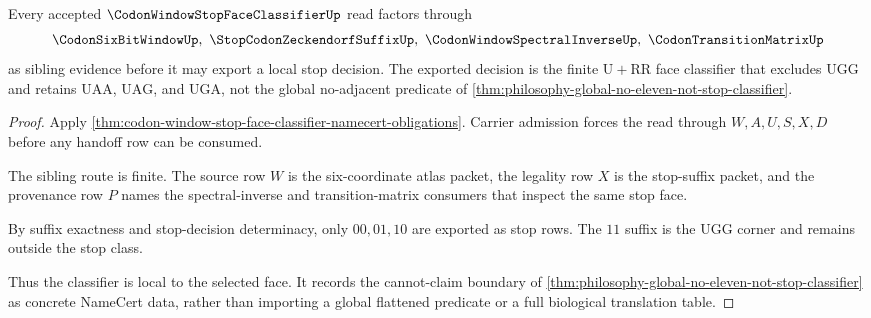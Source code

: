 \begin{theorem}
\label{thm:codon-window-stop-face-classifier-exclusion-route}
Every accepted $\CodonWindowStopFaceClassifierUp$ read factors through
$$
\CodonSixBitWindowUp,\ \StopCodonZeckendorfSuffixUp,\ \CodonWindowSpectralInverseUp,\ \CodonTransitionMatrixUp
$$
as sibling evidence before it may export a local stop decision. The exported decision is the finite $\mathrm{U}+\mathrm{RR}$ face classifier that excludes $\mathrm{UGG}$ and retains $\mathrm{UAA}$, $\mathrm{UAG}$, and $\mathrm{UGA}$, not the global no-adjacent predicate of \autoref{thm:philosophy-global-no-eleven-not-stop-classifier}.
\end{theorem}
\begin{proof}
Apply \autoref{thm:codon-window-stop-face-classifier-namecert-obligations}. Carrier admission forces the read through $W,A,U,S,X,D$ before any handoff row can be consumed.

The sibling route is finite. The source row $W$ is the six-coordinate atlas packet, the legality row $X$ is the stop-suffix packet, and the provenance row $P$ names the spectral-inverse and transition-matrix consumers that inspect the same stop face.

By suffix exactness and stop-decision determinacy, only $00,01,10$ are exported as stop rows. The $11$ suffix is the $\mathrm{UGG}$ corner and remains outside the stop class.

Thus the classifier is local to the selected face. It records the cannot-claim boundary of \autoref{thm:philosophy-global-no-eleven-not-stop-classifier} as concrete NameCert data, rather than importing a global flattened predicate or a full biological translation table.
\end{proof}



